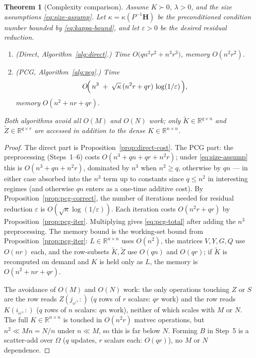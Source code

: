 \documentclass[12pt]{article}
\newtheorem{theorem}{Theorem}
\theoremstyle{definition}
\newcommand{\R}{\mathbb{R}}
\newcommand{\Kt}{\widetilde{K}}
\newcommand{\Zt}{\widetilde{Z}}
\begin{document}
\begin{theorem}[Complexity comparison]\label{thm:complexity}
Assume $K\succ 0$, $\lambda>0$, and the size assumptions \eqref{eq:size-assump}. Let
$\kappa=\kappa(P^{-1}\mathbf{H})$ be the preconditioned condition number bounded by
\eqref{eq:kappa-bound}, and let $\varepsilon>0$ be the desired residual reduction.
\begin{enumerate}
\item[(D)] (Direct, Algorithm~\ref{alg:direct}.) Time
$O\!\bigl(qn^2 r^2 + n^3 r^3\bigr)$, memory $O(n^2 r^2)$.
\item[(P)] (PCG, Algorithm~\ref{alg:pcg}.) Time
\begin{equation}\label{eq:pcg-total}
O\!\Bigl(\,n^3 \;+\; \sqrt{\kappa}\,(n^2 r + qr)\,\log(1/\varepsilon)\,\Bigr),
\end{equation}
memory $O(n^2 + nr + qr)$.
\end{enumerate}
Both algorithms avoid all $O(M)$ and $O(N)$ work; only $\Kt\in\R^{q\times n}$ and
$\Zt\in\R^{q\times r}$ are accessed in addition to the dense $K\in\R^{n\times n}$.
\end{theorem}

\begin{proof}
The direct part is Proposition~\ref{prop:direct-cost}. The PCG part: the preprocessing
(Steps~1--6) costs $O(n^3+qn+qr+n^2 r)$; under \eqref{eq:size-assump} this is
$O(n^3+qn+n^2r)$, dominated by $n^3$ when $n^2\geq q$, otherwise by $qn$ — in either case
absorbed into the $n^3$ term up to constants since $q\leq n^2$ in interesting regimes (and
otherwise $qn$ enters as a one-time additive cost).
By Proposition~\ref{prop:pcg-correct}, the number of iterations needed for residual reduction
$\varepsilon$ is $O(\sqrt\kappa\log(1/\varepsilon))$. Each iteration costs $O(n^2r+qr)$ by
Proposition~\ref{prop:pcg-iter}. Multiplying gives \eqref{eq:pcg-total} after adding the $n^3$
preprocessing.
The memory bound is the working-set bound from Proposition~\ref{prop:pcg-iter}: $L\in\R^{n\times n}$
uses $O(n^2)$, the matrices $V,Y,G,Q$ use $O(nr)$ each, and the row-subsets $\Kt,\Zt$ use
$O(qn)$ and $O(qr)$; if $\Kt$ is recomputed on demand and $K$ is held only as $L$, the memory
is $O(n^2+nr+qr)$.

The avoidance of $O(M)$ and $O(N)$ work: the only operations touching $Z$ or $S$ are the row
reads $Z(j_\omega,:)$ ($q$ rows of $r$ scalars: $qr$ work) and the row reads $K(i_\omega,:)$
($q$ rows of $n$ scalars: $qn$ work), neither of which scales with $M$ or $N$. The full
$K\in\R^{n\times n}$ is touched in $O(n^2 r)$ matvec operations, but $n^2\ll Mn=N/n$ under
$n\ll M$, so this is far below $N$. Forming $B$ in Step~5 is a scatter-add over $\Omega$
($q$ updates, $r$ scalars each: $O(qr)$), no $M$ or $N$ dependence.
\end{proof}
\end{document}
